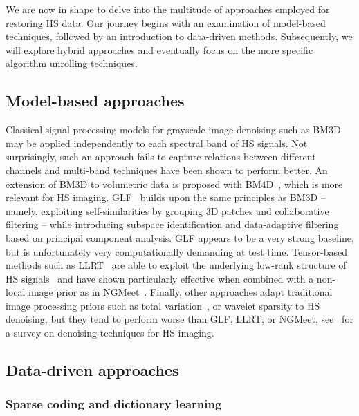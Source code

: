 We are now in shape to delve into the multitude of approaches employed for restoring HS data.
Our journey begins with an examination of model-based techniques, followed by an introduction to data-driven methods.
Subsequently, we will explore hybrid approaches and eventually focus on the more specific algorithm unrolling techniques.

\subsection{Model-based approaches}

Classical signal processing models for grayscale image denoising such as BM3D~\cite{dabov_image_2007}  may be
applied independently to each spectral band of HS signals. 
Not surprisingly, such an approach fails to capture relations between different channels and multi-band techniques have been shown to perform better. 
An extension of BM3D to volumetric data is proposed with BM4D~\cite{maggioni_nonlocal_2013}, which is more relevant for HS imaging.
GLF~\cite{zhuang_hyperspectral_2017} builds upon the same
principles as BM3D -- namely, exploiting self-similarities by grouping 3D
patches and collaborative filtering -- while introducing subspace
identification and data-adaptive filtering based on principal component
analysis.
GLF appears to be a very strong baseline, but is unfortunately very computationally demanding at test time.
Tensor-based methods such as LLRT~\cite{chang_hyper-laplacian_2017} are able to exploit the underlying low-rank structure of HS signals~\cite{fan_spatialspectral_2018, rasti_automatic_2017, zhang_hyperspectral_2014} and have shown particularly effective when combined with a non-local image prior as in NGMeet~\cite{he_non-local_2020}.
Finally, other approaches adapt traditional image processing priors such as
total variation~\cite{yuan_hyperspectral_2014, wang_hyperspectral_2021},
or wavelet sparsity \cite{othman_noise_2006, rasti_hyperspectral_2014}
to HS denoising, but they tend to perform worse than GLF, LLRT, or NGMeet, see~\cite{kong_comprehensive_2020} for a survey on denoising techniques for HS imaging.


\subsection{Data-driven approaches}

\subsubsection{Sparse coding and dictionary learning}

